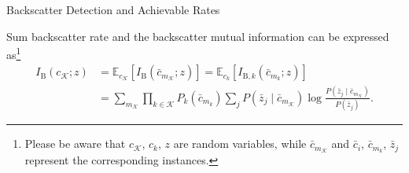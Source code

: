 \documentclass[journal]{IEEEtran}
\begin{document}
\begin{section}{Backscatter Detection and Achievable Rates}
\begin{subsection}{Sum backscatter rate}
			and the backscatter mutual information can be expressed as\footnote{Please be aware that $c_{\mathcal{K}}$, $c_k$, $z$ are random variables, while $\bar{c}_{m_{\mathcal{K}}}$ and $\bar{c}_i$, $\bar{c}_{m_k}$, $\bar{z}_j$ represent the corresponding instances.}
			\begin{subequations}
				\begin{align}
					I_{\mathrm{B}}(c_{\mathcal{K}};z)
					& = \mathbb{E}_{c_{\mathcal{K}}} \left[I_{\mathrm{B}}(\bar{c}_{m_{\mathcal{K}}};z)\right] = \mathbb{E}_{c_k} \left[I_{\mathrm{B},k}(\bar{c}_{m_k};z)\right]\label{eq:backscatter_sum_rate_expectation}\\
					& = \sum_{m_{\mathcal{K}}} \prod_{k \in \mathcal{K}} P_k(\bar{c}_{m_k}) \sum_j P(\bar{z}_j \mid \bar{c}_{m_{\mathcal{K}}}) \log \frac{P(\bar{z}_j \mid \bar{c}_{m_{\mathcal{K}}})}{P(\bar{z}_j)}.\label{eq:backscatter_sum_rate_expansion}
				\end{align}

\end{subequations}
\end{subsection}
\end{section}
\end{document}
